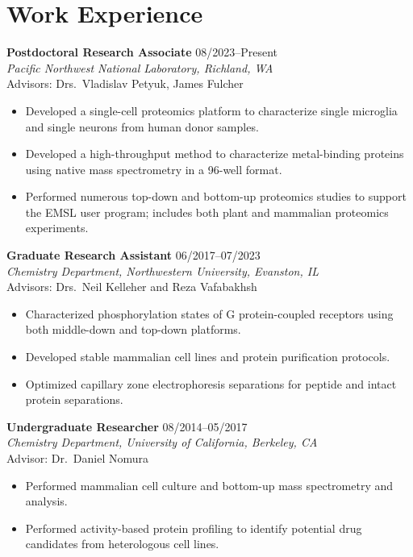 \documentclass[10pt, letterpaper]{article}
\begin{document}
\section{Work Experience}

\textbf{Postdoctoral Research Associate} \hfill 08/2023--Present \\
\textit{Pacific Northwest National Laboratory,
Richland, WA} \\
Advisors: Drs.\ Vladislav Petyuk, James Fulcher
\begin{itemize}
  \item Developed a single-cell proteomics platform to characterize single microglia and single neurons
  from human donor samples.
  \item Developed a high-throughput method to characterize metal-binding proteins using native mass
  spectrometry in a 96-well format.
  \item Performed numerous top-down and bottom-up proteomics studies to support the EMSL user program;
  includes both plant and mammalian proteomics experiments.
\end{itemize}

\vspace{4pt}
\textbf{Graduate Research Assistant} \hfill 06/2017--07/2023 \\
\textit{Chemistry Department, Northwestern University, Evanston, IL} \\
Advisors: Drs.\ Neil Kelleher and Reza Vafabakhsh
\begin{itemize}
  \item Characterized phosphorylation states of G protein-coupled receptors using both
  middle-down and top-down platforms.
  \item Developed stable mammalian cell lines and protein purification protocols.
  \item Optimized capillary zone electrophoresis separations for peptide and intact protein separations.
\end{itemize}

\vspace{4pt}
\textbf{Undergraduate Researcher} \hfill 08/2014--05/2017 \\
\textit{Chemistry Department, University of California, Berkeley, CA} \\
Advisor: Dr.\ Daniel Nomura
\begin{itemize}
  \item Performed mammalian cell culture and bottom-up mass spectrometry and analysis.
  \item Performed activity-based protein profiling to identify potential drug candidates from heterologous
  cell lines.
\end{itemize}
\end{document}

